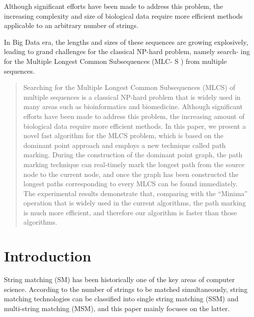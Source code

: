 Although significant efforts have been made to address this problem,
the increasing complexity and size of biological data require more
efficient methods applicable to an arbitrary number of strings.

In Big Data era, the lengths and sizes of these sequences are growing
explosively, leading to grand challenges for the classical NP-hard
problem, namely search- ing for the Multiple Longest Common
Subsequences (MLC- S ) from multiple sequences.



\begin{abstract}

  Searching for the Multiple Longest Common Subsequences (MLCS) of
  multiple sequences is a classical NP-hard problem that is widely
  used in many areas such as bioinformatics and biomedicine. Although
  significant efforts have been made to address this problem, the
  increasing amount of biological data require more efficient
  methods. In this paper, we present a novel fast algorithm for the
  MLCS problem, which is based on the dominant point approach and
  employs a new technique called path marking. During the construction
  of the dominant point graph, the path marking technique can
  real-timely mark the longest path from the source node to the
  current node, and once the graph has been constructed the longest
  paths corresponding to every MLCS can be found immediately. The
  experimental results demonstrate that, comparing with the ``Minima''
  operation that is widely used in the current algorithms, the path
  marking is much more efficient, and therefore our algorithm is
  faster than those algorithms.

\end{abstract}



\section{Introduction}
\label{sec:introduction}

String matching (SM) has been historically one of the key areas of
computer science. According to the number of strings to be matched
simultaneously, string matching technologies can be classified into
single string matching (SSM) and multi-string matching (MSM), and this
paper mainly focuses on the latter.

